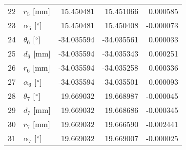 \documentclass{standalone}%
\begin{document}
\begin{tabular}{llrrr}
22 &              $r_{5}$ [mm] &  15.450481 &  15.451066 &   0.000585 \\
23 &  $\alpha_{5}$ [$\degree$] &  15.450481 &  15.450408 &  -0.000073 \\
24 &  $\theta_{6}$ [$\degree$] & -34.035594 & -34.035561 &   0.000033 \\
25 &              $d_{6}$ [mm] & -34.035594 & -34.035343 &   0.000251 \\
26 &              $r_{6}$ [mm] & -34.035594 & -34.035258 &   0.000336 \\
27 &  $\alpha_{6}$ [$\degree$] & -34.035594 & -34.035501 &   0.000093 \\
28 &  $\theta_{7}$ [$\degree$] &  19.669032 &  19.668987 &  -0.000045 \\
29 &              $d_{7}$ [mm] &  19.669032 &  19.668686 &  -0.000345 \\
30 &              $r_{7}$ [mm] &  19.669032 &  19.666590 &  -0.002441 \\
31 &  $\alpha_{7}$ [$\degree$] &  19.669032 &  19.669007 &  -0.000025 \\
\bottomrule
\end{tabular}
%
\end{document}
